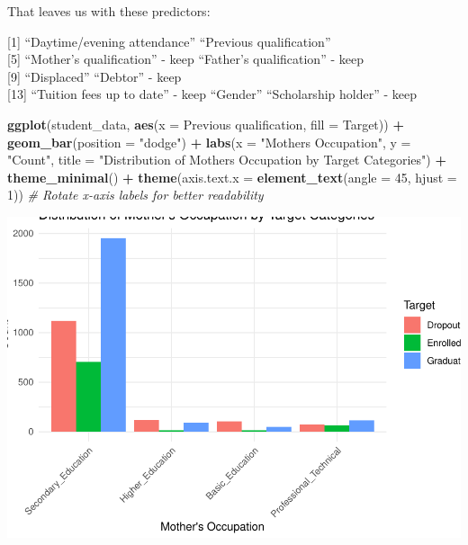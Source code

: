 \documentclass[
]{article}
\newenvironment{Shaded}{\begin{snugshade}}{\end{snugshade}}
\newcommand{\AttributeTok}[1]{\textcolor[rgb]{0.13,0.29,0.53}{#1}}
\newcommand{\CommentTok}[1]{\textcolor[rgb]{0.56,0.35,0.01}{\textit{#1}}}
\newcommand{\DecValTok}[1]{\textcolor[rgb]{0.00,0.00,0.81}{#1}}
\newcommand{\FunctionTok}[1]{\textcolor[rgb]{0.13,0.29,0.53}{\textbf{#1}}}
\newcommand{\NormalTok}[1]{#1}
\newcommand{\SpecialCharTok}[1]{\textcolor[rgb]{0.81,0.36,0.00}{\textbf{#1}}}
\newcommand{\StringTok}[1]{\textcolor[rgb]{0.31,0.60,0.02}{#1}}
\begin{document}
That leaves us with these predictors:

{[}1{]} ``Daytime/evening attendance'' ``Previous qualification''\\
{[}5{]} ``Mother's qualification'' - keep ``Father's qualification'' -
keep\\
{[}9{]} ``Displaced'' ``Debtor'' - keep\\
{[}13{]} ``Tuition fees up to date'' - keep ``Gender'' ``Scholarship
holder'' - keep

\begin{Shaded}
\begin{Highlighting}[]
\FunctionTok{ggplot}\NormalTok{(student\_data, }\FunctionTok{aes}\NormalTok{(}\AttributeTok{x =} \StringTok{\textasciigrave{}}\AttributeTok{Previous qualification}\StringTok{\textasciigrave{}}\NormalTok{, }\AttributeTok{fill =}\NormalTok{ Target)) }\SpecialCharTok{+}
  \FunctionTok{geom\_bar}\NormalTok{(}\AttributeTok{position =} \StringTok{"dodge"}\NormalTok{) }\SpecialCharTok{+}
  \FunctionTok{labs}\NormalTok{(}\AttributeTok{x =} \StringTok{"Mother\textquotesingle{}s Occupation"}\NormalTok{, }\AttributeTok{y =} \StringTok{"Count"}\NormalTok{, }\AttributeTok{title =} \StringTok{"Distribution of Mother\textquotesingle{}s Occupation by Target Categories"}\NormalTok{) }\SpecialCharTok{+}
  \FunctionTok{theme\_minimal}\NormalTok{() }\SpecialCharTok{+}
  \FunctionTok{theme}\NormalTok{(}\AttributeTok{axis.text.x =} \FunctionTok{element\_text}\NormalTok{(}\AttributeTok{angle =} \DecValTok{45}\NormalTok{, }\AttributeTok{hjust =} \DecValTok{1}\NormalTok{))  }\CommentTok{\# Rotate x{-}axis labels for better readability}
\end{Highlighting}
\end{Shaded}

\includegraphics{exploratory_data_analysis_files/figure-latex/unnamed-chunk-25-1.pdf}
\end{document}
